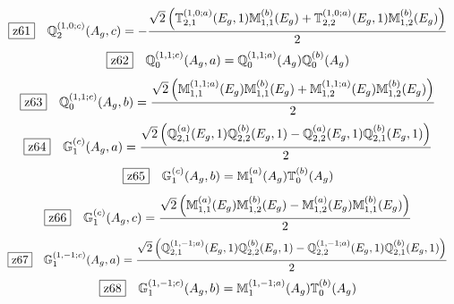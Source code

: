 \documentclass[fleqn,10pt,landscape]{jsarticle}
\begin{document}
\begin{dmath*}
\hspace*{3mm}\fbox{z61}\quad \mathbb{Q}_{2}^{(1,0;c)}(A_{g},c)=- \frac{\sqrt{2} \left(\mathbb{T}_{2,1}^{(1,0;a)}(E_{g},1) \mathbb{M}_{1,1}^{(b)}(E_{g}) + \mathbb{T}_{2,2}^{(1,0;a)}(E_{g},1) \mathbb{M}_{1,2}^{(b)}(E_{g})\right)}{2}
\end{dmath*}
\begin{dmath*}
\hspace*{3mm}\fbox{z62}\quad \mathbb{Q}_{0}^{(1,1;c)}(A_{g},a)=\mathbb{Q}_{0}^{(1,1;a)}(A_{g}) \mathbb{Q}_{0}^{(b)}(A_{g})
\end{dmath*}
\begin{dmath*}
\hspace*{3mm}\fbox{z63}\quad \mathbb{Q}_{0}^{(1,1;c)}(A_{g},b)=\frac{\sqrt{2} \left(\mathbb{M}_{1,1}^{(1,1;a)}(E_{g}) \mathbb{M}_{1,1}^{(b)}(E_{g}) + \mathbb{M}_{1,2}^{(1,1;a)}(E_{g}) \mathbb{M}_{1,2}^{(b)}(E_{g})\right)}{2}
\end{dmath*}
\begin{dmath*}
\hspace*{3mm}\fbox{z64}\quad \mathbb{G}_{1}^{(c)}(A_{g},a)=\frac{\sqrt{2} \left(\mathbb{Q}_{2,1}^{(a)}(E_{g},1) \mathbb{Q}_{2,2}^{(b)}(E_{g},1) - \mathbb{Q}_{2,2}^{(a)}(E_{g},1) \mathbb{Q}_{2,1}^{(b)}(E_{g},1)\right)}{2}
\end{dmath*}
\begin{dmath*}
\hspace*{3mm}\fbox{z65}\quad \mathbb{G}_{1}^{(c)}(A_{g},b)=\mathbb{M}_{1}^{(a)}(A_{g}) \mathbb{T}_{0}^{(b)}(A_{g})
\end{dmath*}
\begin{dmath*}
\hspace*{3mm}\fbox{z66}\quad \mathbb{G}_{1}^{(c)}(A_{g},c)=\frac{\sqrt{2} \left(\mathbb{M}_{1,1}^{(a)}(E_{g}) \mathbb{M}_{1,2}^{(b)}(E_{g}) - \mathbb{M}_{1,2}^{(a)}(E_{g}) \mathbb{M}_{1,1}^{(b)}(E_{g})\right)}{2}
\end{dmath*}
\begin{dmath*}
\hspace*{3mm}\fbox{z67}\quad \mathbb{G}_{1}^{(1,-1;c)}(A_{g},a)=\frac{\sqrt{2} \left(\mathbb{Q}_{2,1}^{(1,-1;a)}(E_{g},1) \mathbb{Q}_{2,2}^{(b)}(E_{g},1) - \mathbb{Q}_{2,2}^{(1,-1;a)}(E_{g},1) \mathbb{Q}_{2,1}^{(b)}(E_{g},1)\right)}{2}
\end{dmath*}
\begin{dmath*}
\hspace*{3mm}\fbox{z68}\quad \mathbb{G}_{1}^{(1,-1;c)}(A_{g},b)=\mathbb{M}_{1}^{(1,-1;a)}(A_{g}) \mathbb{T}_{0}^{(b)}(A_{g})
\end{dmath*}
\end{document}
